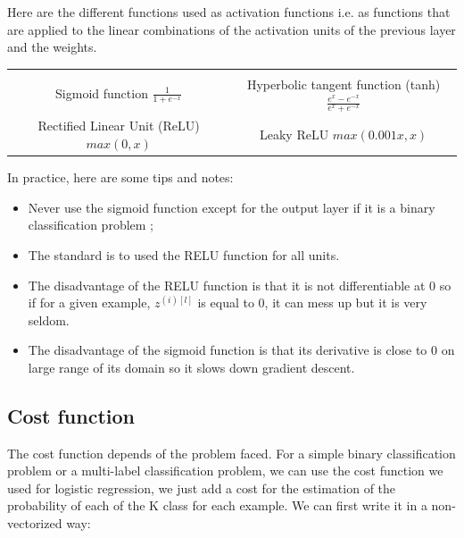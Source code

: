 \documentclass[a4paper, 12pt]{article}
\begin{document}
Here are the different functions used as activation functions i.e. as functions that are applied to the linear combinations of the activation units of the previous layer and the weights.

\begin{center}
\begin{tabular}{ | c | c | }
 \hline \\
 \makecell{Sigmoid function \\
 $ \frac{1}{1+e^{-x}}$
 }
 & \makecell{Hyperbolic tangent function (tanh) \\
 $ \frac{e^{x} - e^{-x}}{e^{x} + e^{-x}}$
 } \\ 
 \hline
\makecell{Rectified Linear Unit (ReLU) \\
$ max(0, x)$
} & \makecell{Leaky ReLU \\
$max(0.001x, x)$
} \\
\hline
\end{tabular}
\end{center}

In practice, here are some tips and notes:

\begin{itemize}
\item Never use the sigmoid function except for the output layer if it is a binary classification problem ;
\item The standard is to used the RELU function for all units.
\item The disadvantage of the RELU function is that it is not differentiable at 0 so if for a given example, $z^{(i)[l]}$ is equal to 0, it can mess up but it is very seldom.
\item The disadvantage of the sigmoid function is that its derivative is close to 0 on large range of its domain so it slows down gradient descent.
\end{itemize}

\subsection{Cost function}

The cost function depends of the problem faced. For a simple binary classification problem or a multi-label classification problem, we can use the cost function we used for logistic regression, we just add a cost for the estimation of the probability of each of the K class for each example. We can first write it in a non-vectorized way: 
\end{document}
